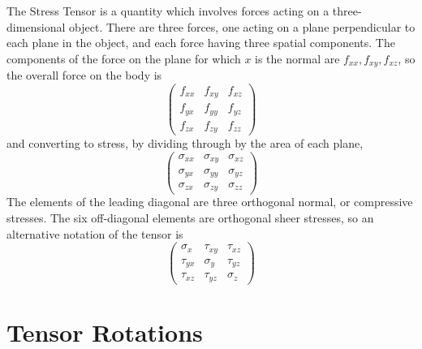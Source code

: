 \begin{example}
  The Stress Tensor is a quantity which involves forces acting on a
  three-dimensional object. There are three forces, one acting on a
  plane perpendicular to each plane in the object, and each force
  having three spatial components. The components of the force on the
  plane for which $x$ is the normal are $f_{xx}, f_{xy}, f_{xz}$, so
  the overall force on the body is
  \begin{equation*}
    \begin{pmatrix}
      f_{xx} & f_{xy} & f_{xz} \\ f_{yx} & f_{yy} & f_{yz} \\ f_{zx} & f_{zy} & f_{zz}
    \end{pmatrix}
  \end{equation*}
  and converting to stress, by dividing through by the area of each
  plane,
  \begin{equation*}
    \begin{pmatrix}
      \sigma_{xx} & \sigma_{xy} & \sigma_{xz} \\ \sigma_{yx} & \sigma_{yy} & \sigma_{yz} \\ \sigma_{zx} & \sigma_{zy} & \sigma_{zz}
    \end{pmatrix}
  \end{equation*}
  The elements of the leading diagonal are three orthogonal normal, or
  compressive stresses. The six off-diagonal elements are orthogonal
  sheer stresses, so an alternative notation of the tensor is
  \begin{equation*}
    \begin{pmatrix}
      \sigma_x & \tau_{xy} & \tau_{xz} \\
      \tau_{yx} & \sigma_y & \tau_{yz} \\
      \tau_{xz} & \tau_{yz} & \sigma_z
    \end{pmatrix}
  \end{equation*}
\end{example}

\section{Tensor Rotations}
\label{sec:tensor-rotations}

